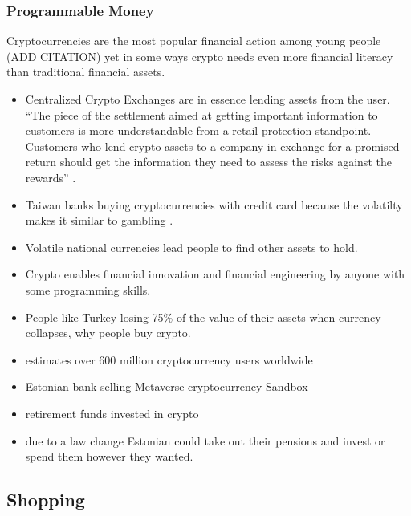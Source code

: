 \documentclass[
  letterpaper,
  DIV=11,
  numbers=noendperiod]{scrartcl}
\providecommand{\tightlist}{%
  \setlength{\itemsep}{0pt}\setlength{\parskip}{0pt}}\usepackage{longtable,booktabs,array}
\begin{document}
\subsubsection{Programmable Money}\label{programmable-money}

Cryptocurrencies are the most popular financial action among young
people (ADD CITATION) yet in some ways crypto needs even more financial
literacy than traditional financial assets.

\begin{itemize}
\item
  Centralized Crypto Exchanges are in essence lending assets from the
  user. ``The piece of the settlement aimed at getting important
  information to customers is more understandable from a retail
  protection standpoint. Customers who lend crypto assets to a company
  in exchange for a promised return should get the information they need
  to assess the risks against the rewards''
  \citep{hesterm.peirceSECGovStatement2022}.
\item
  Taiwan banks buying cryptocurrencies with credit card because the
  volatilty makes it similar to gambling
  \citep{davidattleeBuyingCryptoCredit2022, MiHuoBi2022}.
\end{itemize}

\begin{itemize}
\tightlist
\item
  Volatile national currencies lead people to find other assets to hold.
\item
  Crypto enables financial innovation and financial engineering by
  anyone with some programming skills.
\item
  People like Turkey losing 75\% of the value of their assets when
  currency collapses, why people buy crypto.
\item
  \citet{CryptocurrenciesWorldwideStatista} estimates over 600 million
  cryptocurrency users worldwide
\item
  \citet{raidotonissonLHVToiKlientideni2022} Estonian bank selling
  Metaverse cryptocurrency Sandbox
\item
  \citet{martenpollumeesKuhuInvesteeritiLHV2022} retirement funds
  invested in crypto
\item
  \citet{raidotonissonSedaAktsionaridOstaksid2022} due to a law change
  Estonian could take out their pensions and invest or spend them
  however they wanted.
\end{itemize}

\subsection{Shopping}\label{shopping}
\end{document}
